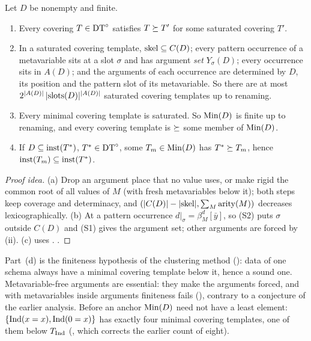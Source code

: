\begin{theorem}\label{thm:single:min}
Let $D$ be nonempty and finite.
\begin{enumerate}[label=(\alph*)]
\item Every covering $T\in\mathrm{DT}^{\circ}$ satisfies $T\succeq T'$ for some saturated covering $T'$.
\item In a saturated covering template, $\mathrm{skel}\subseteq C(D)$; every pattern occurrence of a metavariable sits at a slot $\sigma$ and has argument \emph{set} $Y_\sigma(D)$; every occurrence sits in $A(D)$; and the arguments of each occurrence are determined by $D$, its position and the pattern slot of its metavariable. So there are at most $2^{|A(D)|}\,|\mathrm{slots}(D)|^{|A(D)|}$ saturated covering templates up to renaming.
\item Every minimal covering template is saturated. So $\mathrm{Min}(D)$ is finite up to renaming, and every covering template is $\succeq$ some member of $\mathrm{Min}(D)$.
\item If $D\subseteq\mathrm{inst}(T^*)$, $T^*\in\mathrm{DT}^{\circ}$, some $T_m\in\mathrm{Min}(D)$ has $T^*\succeq T_m$, hence $\mathrm{inst}(T_m)\subseteq\mathrm{inst}(T^*)$.
\end{enumerate}
\end{theorem}

\begin{proof}[Proof idea]
(a) Drop an argument place that no value uses, or make rigid the common root of all values of $M$ (with fresh metavariables below it); both steps keep coverage and determinacy, and $(|C(D)|-|\mathrm{skel}|,\sum_M\mathrm{arity}(M))$ decreases lexicographically. (b) At a pattern occurrence $d|_\sigma=\beta^d_M[\bar y]$, so (S2) puts $\sigma$ outside $C(D)$ and (S1) gives the argument set; other arguments are forced by (ii). (c) uses . .
\end{proof}

Part~(d) is the finiteness hypothesis of the clustering method (): data of one schema always have a minimal covering template below it, hence a sound one. Metavariable-free arguments are essential: they make the arguments forced, and with metavariables inside arguments finiteness fails (), contrary to a conjecture of the earlier analysis. Before an anchor $\mathrm{Min}(D)$ need not have a least element: $\{\mathrm{Ind}(x=x),\mathrm{Ind}(0=x)\}$ has exactly four minimal covering templates, one of them below $T_{\mathrm{Ind}}$ (, which corrects the earlier count of eight).


